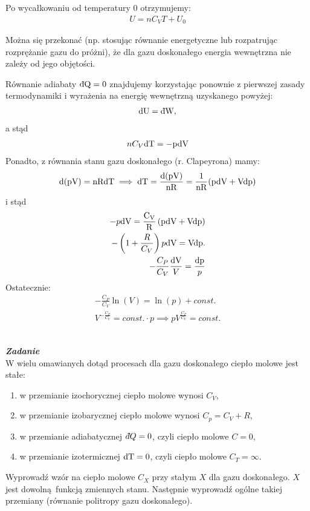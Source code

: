 \documentclass[11pt,a4paper]{article}
\newcounter{zadanie}\newcommand{\zadanie}[1][]{\addtocounter{zadanie}{1} ~\\  {\bf \emph{Zadanie \arabic{zadanie} #1 }} \\}
\newcommand{\dbar}{{\mkern3mu\mathchar'26\mkern-12mu d}}
\begin{document}
Po wycałkowaniu od temperatury 0 otrzymujemy:
\begin{align}
U = n C_V T + U_{0}
\end{align}

Można się przekonać (np. stosując równanie energetyczne lub rozpatrując
rozprężanie gazu do próżni), że dla gazu doskonałego energia wewnętrzna nie
zależy od jego objętości. 

Równanie adiabaty $\rm{\dbar} Q =0$ znajdujemy korzystając ponownie z pierwszej zasady termodynamiki 
i wyrażenia na energię wewnętrzną uzyskanego powyżej:
\begin{align}
\rm{d}U = \rm{\dbar} W,
\end{align} 
a stąd
\begin{align}
n C_V \rm{d} T = - p \rm{d}V
\end{align}
Ponadto, z równania stanu gazu doskonałego (r. Clapeyrona) mamy:
\begin{align}
\rm{d}(pV) = n R \rm{d} T \implies  \rm{d} T = \frac{\rm{d}(pV)}{n R} = \frac{1}{n R}(p\rm{d}V + V\rm{d}p  )
\end{align}
i stąd
\begin{align}
- p \rm{d}V  = \frac{C_V}{R}\left(  p \rm{d}V +  V \rm{d}p \right)\\
- \left( 1 + \frac{R}{C_V}\right) p \rm{d}V = V \rm{d}p. \\
-\frac{C_P}{C_V}\frac{\rm{d} V}{V}=\frac{\rm{d} p}{p}
\end{align}
Ostatecznie:
\begin{align*}
-\frac{C_P}{C_V}\ln(V) = \ln(p) + const. \\
V^{-\frac{C_P}{C_V}} = const. \cdot p \implies pV^{\frac{C_P}{C_V}} = const.
\end{align*}
\newpage
\zadanie
W wielu omawianych dotąd procesach dla gazu doskonałego ciepło molowe jest stałe:
\begin{enumerate}
\item w przemianie izochorycznej ciepło molowe wynosi $C_V$,
\item w przemianie izobarycznej ciepło molowe wynosi $C_p = C_V + R$,
\item w przemianie adiabatycznej $\dbar Q = 0$, czyli ciepło molowe $C = 0$,
\item w przemianie izotermicznej $\rm{d}T = 0$, czyli ciepło molowe $C_T = \infty$.
\end{enumerate}
Wyprowadź wzór na ciepło molowe $C_X$ przy stałym $X$ dla gazu doskonałego.
$X$ jest dowolną funkcją zmiennych stanu. Następnie wyprowadź ogólne takiej 
przemiany (równanie politropy gazu doskonałego).
\end{document}
